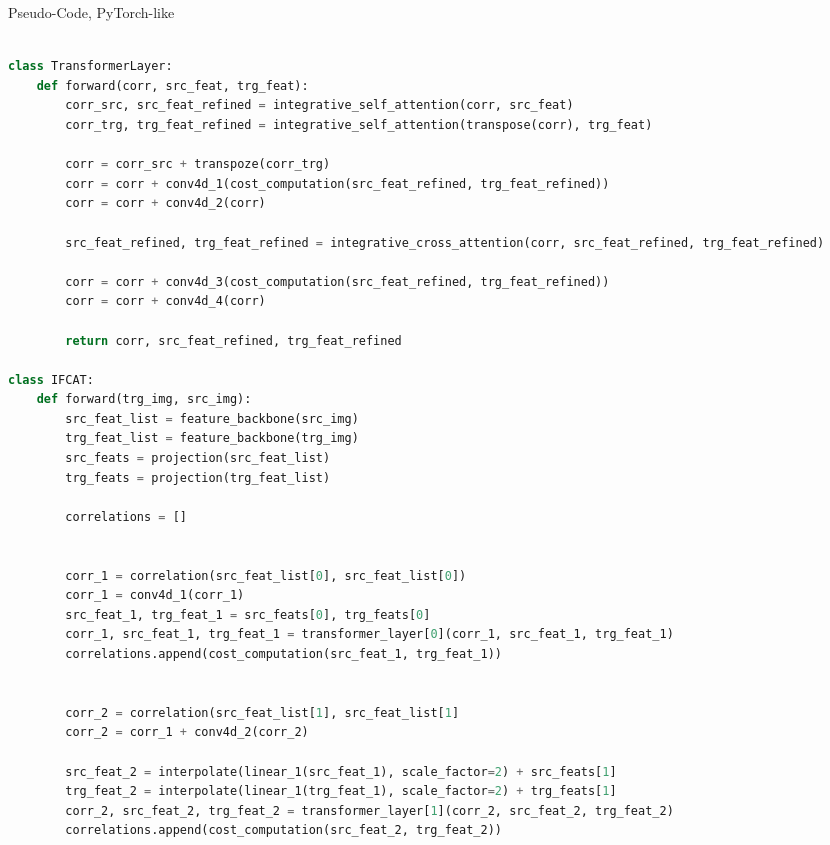 \begin{algorithm*}[t]
\caption{Pseudo-Code, PyTorch-like}
\label{1}

\begin{lstlisting}[language=python]

class TransformerLayer:
    def forward(corr, src_feat, trg_feat):
        corr_src, src_feat_refined = integrative_self_attention(corr, src_feat)
        corr_trg, trg_feat_refined = integrative_self_attention(transpose(corr), trg_feat)

        corr = corr_src + transpoze(corr_trg)
        corr = corr + conv4d_1(cost_computation(src_feat_refined, trg_feat_refined))
        corr = corr + conv4d_2(corr)

        src_feat_refined, trg_feat_refined = integrative_cross_attention(corr, src_feat_refined, trg_feat_refined)

        corr = corr + conv4d_3(cost_computation(src_feat_refined, trg_feat_refined))
        corr = corr + conv4d_4(corr)

        return corr, src_feat_refined, trg_feat_refined

class IFCAT:
    def forward(trg_img, src_img):
        src_feat_list = feature_backbone(src_img)
        trg_feat_list = feature_backbone(trg_img)
        src_feats = projection(src_feat_list)
        trg_feats = projection(trg_feat_list)

        correlations = []


        corr_1 = correlation(src_feat_list[0], src_feat_list[0])
        corr_1 = conv4d_1(corr_1)
        src_feat_1, trg_feat_1 = src_feats[0], trg_feats[0]
        corr_1, src_feat_1, trg_feat_1 = transformer_layer[0](corr_1, src_feat_1, trg_feat_1)
        correlations.append(cost_computation(src_feat_1, trg_feat_1))


        corr_2 = correlation(src_feat_list[1], src_feat_list[1]
        corr_2 = corr_1 + conv4d_2(corr_2)

        src_feat_2 = interpolate(linear_1(src_feat_1), scale_factor=2) + src_feats[1]
        trg_feat_2 = interpolate(linear_1(trg_feat_1), scale_factor=2) + trg_feats[1]
        corr_2, src_feat_2, trg_feat_2 = transformer_layer[1](corr_2, src_feat_2, trg_feat_2)
        correlations.append(cost_computation(src_feat_2, trg_feat_2))



\end{lstlisting}
\end{algorithm*}
